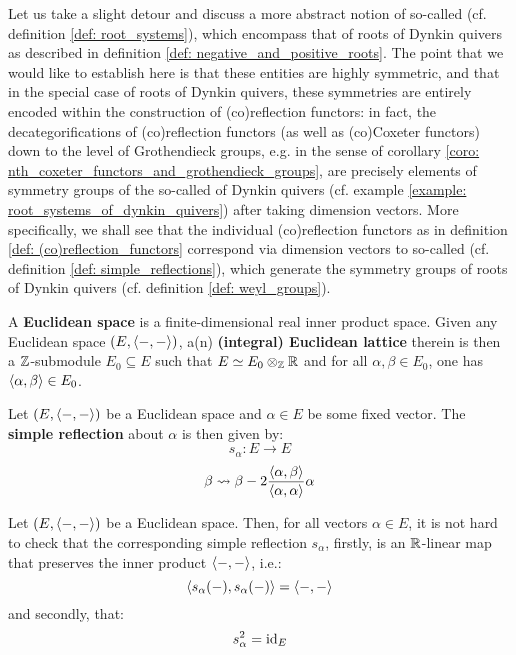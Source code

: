             Let us take a slight detour and discuss a more abstract notion of so-called  (cf. definition \ref{def: root_systems}), which encompass that of roots of Dynkin quivers as described in definition \ref{def: negative_and_positive_roots}. The point that we would like to establish here is that these entities are highly symmetric, and that in the special case of roots of Dynkin quivers, these symmetries are entirely encoded within the construction of (co)reflection functors: in fact, the decategorifications of (co)reflection functors (as well as (co)Coxeter functors) down to the level of Grothendieck groups, e.g. in the sense of corollary \ref{coro: nth_coxeter_functors_and_grothendieck_groups}, are precisely elements of symmetry groups of the so-called  of Dynkin quivers (cf. example \ref{example: root_systems_of_dynkin_quivers}) after taking dimension vectors. More specifically, we shall see that the individual (co)reflection functors as in definition \ref{def: (co)reflection_functors} correspond via dimension vectors to so-called  (cf. definition \ref{def: simple_reflections}), which generate the symmetry groups of roots of Dynkin quivers (cf. definition \ref{def: weyl_groups}). 
            \begin{definition} \label{defL euclidean_spaces}
                A \textbf{Euclidean space} is a finite-dimensional real inner product space. Given any Euclidean space $(E, \langle-, -\rangle)$, a(n) \textbf{(integral) Euclidean lattice} therein is then a $\mathbb{Z}$-submodule $E_0 \subseteq E$ such that $E \cong E_0 \tensor_{\Z} \R$ and for all $\alpha, \beta \in E_0$, one has $\langle\alpha, \beta\rangle \in E_0$.
            \end{definition}
            \begin{definition} \label{def: simple_reflections}
                Let $(E, \langle-, -\rangle)$ be a Euclidean space and $\alpha \in E$ be some fixed vector. The \textbf{simple reflection} about $\alpha$ is then given by:
                    $$s_{\alpha}: E \to E$$
                    $$\beta \leadsto \beta - 2\frac{\langle\alpha, \beta\rangle}{\langle\alpha, \alpha\rangle} \alpha$$
            \end{definition}
            \begin{remark} \label{remark: simple_reflections_are_involutive_isometries}
                Let $(E, \langle-, -\rangle)$ be a Euclidean space. Then, for all vectors $\alpha \in E$, it is not hard to check that the corresponding simple reflection $s_{\alpha}$, firstly, is an $\mathbb{R}$-linear map that preserves the inner product $\langle-, -\rangle$, i.e.:
                    $$\langle s_{\alpha}(-), s_{\alpha}(-)\rangle = \langle-, -\rangle$$
                and secondly, that:
                    $$s_{\alpha}^2 = \mathrm{id}_E$$
            \end{remark}
